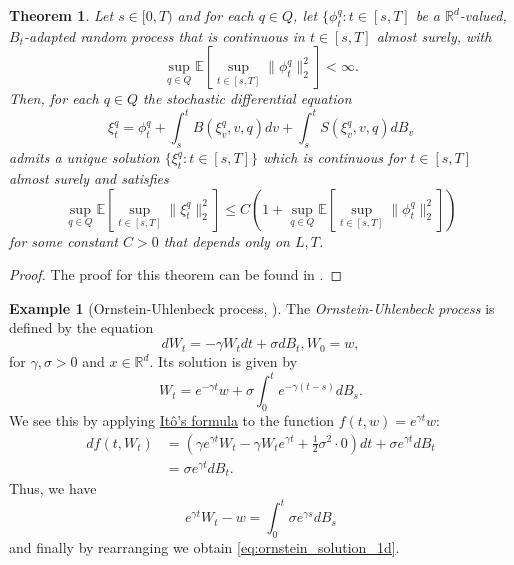 \documentclass[12pt]{article}
\newtheorem{theorem}{Theorem}[section]
\theoremstyle{definition}
\newtheorem{example}[example]{Example}
\numberwithin{equation}{section}
\newcommand{\R}{\mathbb{R}}
\newcommand{\ev}[1]{\mathbb{E}\left[{#1}\right]}
\newcommand{\norm}[1]{\lVert{#1}\rVert_2}
\begin{document}
\begin{theorem}
  \label{thm:sde_existence}
  Let $s \in [0,T)$ and for each $q \in Q$, let $\{\phi_t^q : t \in [s,T]$ be a $\R^d$-valued, $B_t$-adapted random process that is continuous in $t \in [s,T]$ almost surely, with
  \begin{equation*}
    \sup_{q \in Q} \ev{\sup_{t \in [s,T]} \norm{\phi^q_t}^2} < \infty.
  \end{equation*}
  Then, for each $q \in Q$ the stochastic differential equation
  \begin{equation*}
    \xi^q_t = \phi_t^q + \int_s^t B(\xi^q_v,v,q)dv + \int_s^tS(\xi_v^q, v, q)dB_v
  \end{equation*}
  admits a unique solution $\{\xi_t^q : t \in [s,T]\}$ which is continuous for $t\in [s,T]$ almost surely and satisfies
  \begin{equation*}
    \sup_{q \in Q} \ev{\sup_{t \in [s,T]} \norm{\xi^q_t}^2} \leq C \left( 1 + \sup_{q \in Q} \ev{\sup_{t \in [s,T]} \norm{\phi^q_t}^2}\right)
  \end{equation*}
  for some constant $C > 0$ that depends only on $L,T$.
\end{theorem}
\begin{proof}
  The proof for this theorem can be found in \cite{liStochasticModifiedEquations2019}.
\end{proof}
\begin{example}[Ornstein-Uhlenbeck process, ]
  \label{ex:ornstein_uhlenbeck}
  The \emph{Ornstein-Uhlenbeck process} is defined by the equation
  \begin{equation}
    dW_t = -\gamma W_t dt + \sigma dB_t, W_0 = w,
  \end{equation}
  for $\gamma, \sigma > 0$ and $x \in \R^d$.
  Its solution is given by 
  \begin{equation}
    \label{eq:ornstein_solution_1d}
    W_t = e^{-\gamma t}w + \sigma \int_0^t e^{-\gamma (t - s)}dB_s.
  \end{equation}
  We see this by applying \hyperref[thm:ito_formula]{Itô's formula} to the function $f(t,w) = e^{\gamma t}w$:
  \begin{align*}
    df(t,W_t) &= \left(\gamma e^{\gamma t}W_t -\gamma W_t e^{\gamma t} + \frac{1}{2} \sigma^2 \cdot 0 \right)dt + \sigma e^{\gamma t} dB_t \\
    &= \sigma e^{\gamma t} dB_t.
  \end{align*}
  Thus, we have 
  \begin{equation*}
    e^{\gamma t}W_t - w = \int_0^t \sigma e^{\gamma s} dB_s
  \end{equation*}
  and finally by rearranging we obtain \eqref{eq:ornstein_solution_1d}.
  
\end{example}
\end{document}
